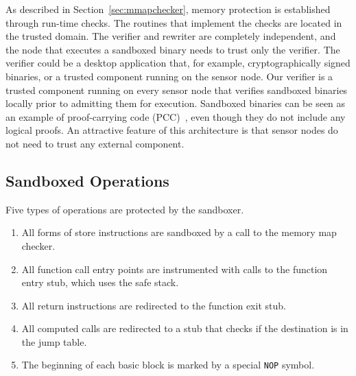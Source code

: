 %
As described in Section~\ref{sec:mmapchecker}, memory protection is
established through run-time checks. 
%
%
The routines that implement the checks are located in the trusted
domain.
%
%
%
The verifier and rewriter are completely independent, and
%
the node that executes a sandboxed binary needs to trust only the
verifier.
%
The verifier could be a desktop application that, for example,
cryptographically signed binaries, or a trusted component running on the
sensor node.
%
%
%
Our verifier is a trusted component running on every sensor
node that verifies sandboxed binaries locally prior to admitting them
for execution.
%
Sandboxed binaries can be seen as an example of proof-carrying code
(PCC)~\cite{necula96pcc}, even though they do not include any logical
proofs.
%
An attractive feature of this architecture is that sensor nodes do not
need to trust any external component.
%
%
\subsection{Sandboxed Operations}
%
Five types of operations are protected by the sandboxer.
%
\begin{enumerate}
%
\item{All forms of store instructions are sandboxed by a call to the
memory map checker.}
%
\item{All function call entry points are instrumented with calls to
the function entry stub, which uses the safe stack.}
%
\item{All return instructions are redirected to the function exit stub.}
%
\item{All computed calls are redirected to a stub that checks if
the destination is in the jump table.} 
%
\item{The beginning of each basic block is marked by a special
\texttt{NOP} symbol.}
%
\end{enumerate}

